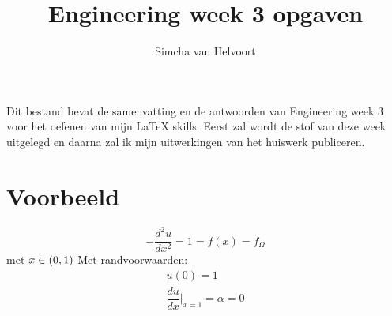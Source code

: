 \documentclass[11pt]{article}
\begin{document}
\title{Engineering week 3 opgaven}
\author{Simcha van Helvoort}
\maketitle

Dit bestand bevat de samenvatting en de antwoorden van Engineering week 3 voor het oefenen van mijn LaTeX skills. Eerst zal wordt de stof van deze week uitgelegd en daarna zal ik mijn uitwerkingen van het huiswerk publiceren.

\newpage

\section{Voorbeeld}

$$-\dfrac{d^2u}{dx^2} = 1 = f(x) = f_{\Omega}$$ met $x \in (0, 1) \\
$
Met randvoorwaarden:
\begin{align*}
    u(0) = 1\\
	\dfrac{du}{dx}\Big|_{x = 1} = \alpha = 0
\end{align*}
\end{document}
